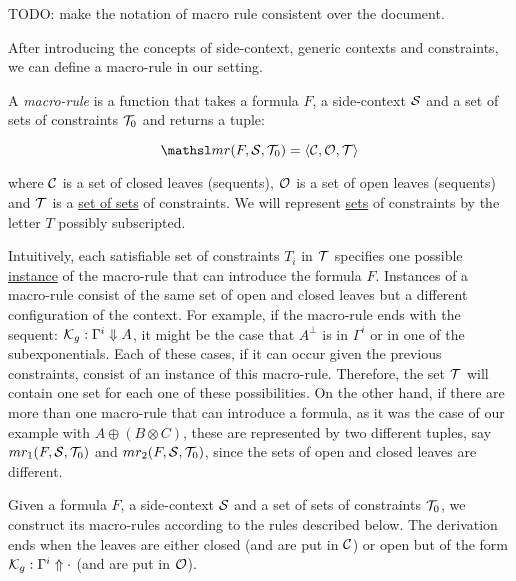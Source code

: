 \begin{giselle}
TODO: make the notation of macro rule consistent over the document.
\end{giselle}

After introducing the concepts of side-context, generic contexts and
constraints, we can define a macro-rule in our setting.

A \textit{macro-rule} is a function that takes a formula $F$, a side-context
$\mathcal{S}$ and a set of sets of constraints $\mathcal{T}_0$ and returns a tuple:

$$\mr{F}{\Sscr}{\Tscr_0} = \langle \Cscr, \Oscr, \Tscr \rangle$$

where $\mathcal{C}$ is a set of closed leaves (sequents), $\mathcal{O}$ is a set of open
leaves (sequents) and $\mathcal{T}$ is a \underline{set of sets} of constraints. We
will represent \underline{sets} of constraints by the letter $T$ possibly
subscripted.

Intuitively, each satisfiable set of constraints $T_i$ in $\mathcal{T}$ specifies one possible
\underline{instance} of the macro-rule that can introduce the formula $F$. Instances of a
macro-rule consist of the same set of open and closed leaves but a different
configuration of the context. For example, if the macro-rule ends with the
sequent: $\mathcal{K}_{g} : \Gamma^i \Downarrow A$, it might be the case that
$A^{\bot}$ is in $\Gamma^i$ or in one of the subexponentials. Each of these cases,
if it can occur given the previous constraints, consist of an instance of this
macro-rule. Therefore, the set $\mathcal{T}$ will contain one set for each one of
these possibilities. On the other hand, if there are more than one 
macro-rule that can introduce a
formula, as it was the case of our example with $A \oplus (B \otimes C)$, these
are represented by two different tuples, say $mr_1(F, \mathcal{S}, \mathcal{T}_0)$ and
$mr_2(F, \mathcal{S}, \mathcal{T}_0)$, since the
sets of open and closed leaves are different.

Given a formula $F$, a side-context $\mathcal{S}$ and a set of sets of constraints
$\mathcal{T}_0$, we construct its macro-rules according to the rules described below.
The derivation ends when the leaves are either closed (and are put in $\mathcal{C}$) or
open but of the form $\mathcal{K}_{g} : \Gamma^i \Uparrow \cdot$ (and are put in $\mathcal{O}$).

